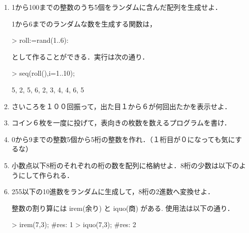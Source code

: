 \begin{enumerate}
\item 1から100までの整数のうち5個をランダムに含んだ配列を生成せよ．

1から6までのランダムな数を生成する関数は，
\begin{MapleInput}
> roll:=rand(1..6):
\end{MapleInput}
として作ることができる．実行は次の通り．
\begin{MapleInput}
> seq(roll(),i=1..10);
\end{MapleInput}
\begin{MapleOutput}
5, 2, 5, 6, 2, 3, 4, 4, 6, 5
\end{MapleOutput}
\item さいころを１００回振って，出た目１から６が何回出たかを表示せよ．
\item コイン６枚を一度に投げて，表向きの枚数を数えるプログラムを書け．
\item 0から9までの整数5個から5桁の整数を作れ．（１桁目が０になっても気にするな）
\item 小数点以下8桁のそれぞれの桁の数を配列に格納せよ．8桁の少数は以下のようにして作られる．
\item 255以下の10進数をランダムに生成して，8桁の2進数へ変換せよ．

整数の割り算には irem(余り) と iquo(商) がある. 使用法は以下の通り．
\begin{MapleInput}
> irem(7,3); #res: 1
> iquo(7,3); #res: 2
\end{MapleInput}
\end{enumerate}